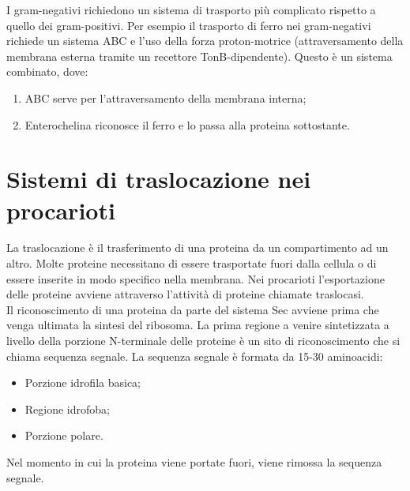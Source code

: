 I gram-negativi richiedono un sistema di trasporto pi\`u complicato rispetto a quello dei gram-positivi. Per esempio il trasporto di ferro nei gram-negativi richiede un sistema ABC e l'uso della forza proton-motrice (attraversamento della membrana esterna tramite un recettore TonB-dipendente). Questo \`e un sistema combinato, dove:
\begin{enumerate}
    \item ABC serve per l'attraversamento della membrana interna; 
    \item Enterochelina riconosce il ferro e lo passa alla proteina sottostante.
\end{enumerate}
\section{Sistemi di traslocazione nei procarioti}
La traslocazione \`e il trasferimento di una proteina da un compartimento ad un altro. Molte proteine necessitano di essere trasportate fuori dalla cellula o di essere inserite in modo specifico nella membrana. Nei procarioti l'esportazione delle proteine avviene attraverso l'attivit\`a di proteine chiamate traslocasi. 
\\Il riconoscimento di una proteina da parte del sistema Sec avviene prima che venga ultimata la sintesi del ribosoma. La prima regione a venire sintetizzata a livello della porzione N-terminale delle proteine \`e un sito di riconoscimento che si chiama sequenza segnale. La sequenza segnale \`e formata da 15-30 aminoacidi:
\begin{itemize}
    \item Porzione idrofila basica; 
    \item Regione idrofoba; 
    \item Porzione polare.
\end{itemize}
Nel momento in cui la proteina viene portate fuori, viene rimossa la sequenza segnale.
